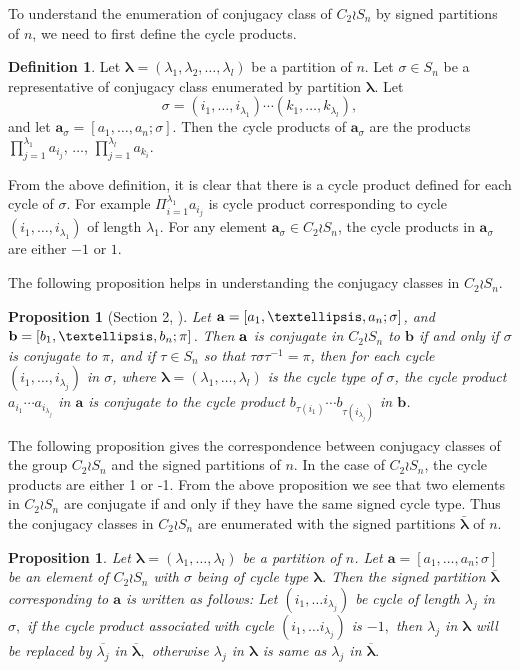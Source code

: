 \documentclass[12pt,twoside,reqno]{amsart}
\newtheorem{proposition}[theorem]{Proposition}
\theoremstyle{definition}
\newtheorem{defn}[theorem]{Definition}
\numberwithin{equation}{section}
\newcommand{\bmf}[1]{\mathbf{#1}}
\newcommand{\lbd}{\lambda}
\newcommand{\Lbd}{\bm {\lambda}}
\begin{document}
To understand the enumeration of conjugacy class of $C_2 \wr S_n$ by signed partitions of $n$, we need to first define the cycle products.

\begin{defn}
Let $\Lbd = (\lbd_1, \lbd_2,\ldots, \lbd_l)$ be a partition of $n.$
Let $\sigma \in S_n$ be a representative of conjugacy class enumerated by partition $\Lbd.$ Let $$\sigma = (i_1,\ldots, i_{\lbd_1})\cdots(k_1,\ldots, k_{\lbd_l}),$$ and let $\bmf{a}_\sigma = [a_1, \ldots, a_n; \sigma]$. Then the {\emph cycle products} of $\bmf{a}_\sigma$ are the products $\prod_{j=1}^{\lbd_1}a_{i_j}$, $\ldots$, $\prod_{j=1}^{\lbd_l}a_{k_i}$. 
\end{defn}
From the above definition, it is clear that there is a cycle product defined for each cycle of $\sigma.$ For example $\Pi_{i=1}^{\lbd_1}a_{i_j}$ is cycle product corresponding to cycle $(i_1,\ldots, i_{\lbd_1})$  of length $\lbd_1.$
For any element $\bmf{a}_\sigma \in C_2 \wr S_n$, the cycle products in $\bmf{a}_\sigma$ are either $-1$ or $1.$ 

The following proposition helps in understanding the conjugacy classes in $C_2 \wr S_n.$

\begin{proposition}[Section 2, \cite{MS}]\label{Conjugacy_classes_C2wrSn}
Let ${\bf a} = [a_1,\ldots, a_n; \sigma]$, and ${\bf b}=[b_1,\ldots, b_n; \pi]$. Then ${\bf a}$ is conjugate in $C_2 \wr S_n$ to $\bmf{b}$ if and only if $\sigma$ is conjugate to $\pi$, and if $\tau \in S_n$ so that $\tau \sigma \tau^{-1} = \pi$, then for each cycle $(i_1, \ldots, i_{\lbd_j})$ in $\sigma$, where $\Lbd = (\lbd_1, \ldots, \lbd_l)$ is the cycle type of $\sigma$, the cycle product $a_{i_1}\cdots a_{i_{\lbd_j}}$ in $\bmf{a}$ is conjugate to the cycle product $b_{\tau(i_1)}\cdots b_{\tau(i_{\lbd_j})}$ in $\bmf{b}$. 
\end{proposition} 
The following proposition gives the correspondence between conjugacy classes of the group $C_2 \wr S_n$ and the signed partitions of $n.$
In the case of $C_2\wr S_n$, the cycle products are either 1 or -1. From the above proposition we see that two elements in $C_2\wr S_n$ are conjugate if and only if they have the same signed cycle type. Thus the conjugacy classes in $C_2 \wr S_n$ are enumerated with the signed partitions $\bar{\Lbd}$ of $n.$ 

\begin{proposition}
Let $\Lbd = (\lbd_1, \ldots, \lbd_l)$ be a partition of $n$. Let $\bmf{a} = [a_1, \ldots, a_n; \sigma]$ be an element of $C_2 \wr S_n$ with $\sigma$ being of cycle type $\Lbd$. Then the signed partition $\overline{\Lbd}$ corresponding to $\bmf{a}$ is written as follows:
 Let $(i_1, \ldots i_{\lbd_j})$ be cycle of length $\lbd_j$ in $\sigma,$ if the cycle product associated with cycle  $(i_1, \ldots i_{\lbd_j})$ is $-1, $ 
 then $\lbd_j$ in $\Lbd$ will be replaced by 
 $\overline{\lbd_j}$ in $\overline{\Lbd},$ otherwise 
 $\lbd_j$ in $\Lbd$ is same as $\lbd_j$ in 
 $\overline{\Lbd}. $ 
 \end{proposition}
\end{document}

